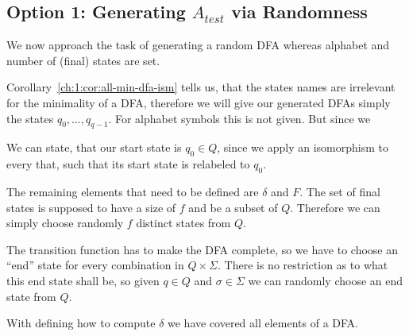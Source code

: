 \subsection{Option 1: Generating $A_{test}$ via Randomness}

We now approach the task of generating a random DFA whereas alphabet and number of (final) states are set.

Corollary~\ref{ch:1:cor:all-min-dfa-ism} tells us, that the states names are irrelevant for the minimality of a DFA, therefore we will give our generated DFAs simply the states $q_0, \ldots, q_{q-1}$. For alphabet symbols this is not given. But since we 

We can state, that our start state is $q_0 \in Q$, since we apply an isomorphism to every that, such that its start state is relabeled to $q_0$.

The remaining elements that need to be defined are $\delta$ and $F$. The set of final states is supposed to have a size of $f$ and be a subset of $Q$. Therefore we can simply choose randomly $f$ distinct states from $Q$.

The transition function has to make the DFA complete, so we have to choose an ``end'' state for every combination in $Q \times \Sigma$. There is no restriction as to what this end state shall be, so given $q \in Q$ and $\sigma \in \Sigma$ we can randomly choose an end state from $Q$.

With defining how to compute $\delta$ we have covered all elements of a DFA.

